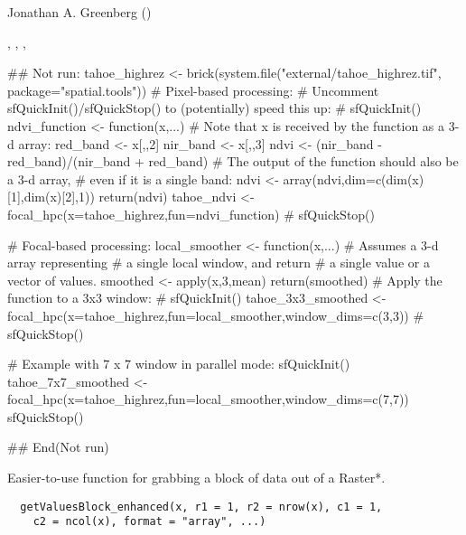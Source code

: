 \documentclass[a4paper]{book}
\begin{document}
%
\begin{Author}\relax
Jonathan A. Greenberg
()
\end{Author}
%
\begin{SeeAlso}\relax
{}, ,
, 
\end{SeeAlso}
%
\begin{Examples}
\begin{ExampleCode}
## Not run: 
 tahoe_highrez <- brick(system.file("external/tahoe_highrez.tif", package="spatial.tools"))
# Pixel-based processing:
# Uncomment sfQuickInit()/sfQuickStop() to (potentially) speed this up:
# sfQuickInit()
	ndvi_function <- function(x,...)
	{
		# Note that x is received by the function as a 3-d array:
		red_band <- x[,,2]
		nir_band <- x[,,3]
		ndvi <- (nir_band - red_band)/(nir_band + red_band)
		# The output of the function should also be a 3-d array,
		# even if it is a single band:
		ndvi <- array(ndvi,dim=c(dim(x)[1],dim(x)[2],1))
		return(ndvi)
	}
 tahoe_ndvi <- focal_hpc(x=tahoe_highrez,fun=ndvi_function)
# sfQuickStop()

# Focal-based processing:
local_smoother <- function(x,...)
{
 # Assumes a 3-d array representing
	# a single local window, and return
 # a single value or a vector of values.
	smoothed <- apply(x,3,mean)
	return(smoothed)
}
# Apply the function to a 3x3 window:
# sfQuickInit()
tahoe_3x3_smoothed <- focal_hpc(x=tahoe_highrez,fun=local_smoother,window_dims=c(3,3))
# sfQuickStop()

# Example with 7 x 7 window in parallel mode:
sfQuickInit()
tahoe_7x7_smoothed <- focal_hpc(x=tahoe_highrez,fun=local_smoother,window_dims=c(7,7))
sfQuickStop()

## End(Not run)
\end{ExampleCode}
\end{Examples}
%
\begin{Description}\relax
Easier-to-use function for grabbing a block of data out
of a Raster*.
\end{Description}
%
\begin{Usage}
\begin{verbatim}
  getValuesBlock_enhanced(x, r1 = 1, r2 = nrow(x), c1 = 1,
    c2 = ncol(x), format = "array", ...)
\end{verbatim}
\end{Usage}
\end{document}
